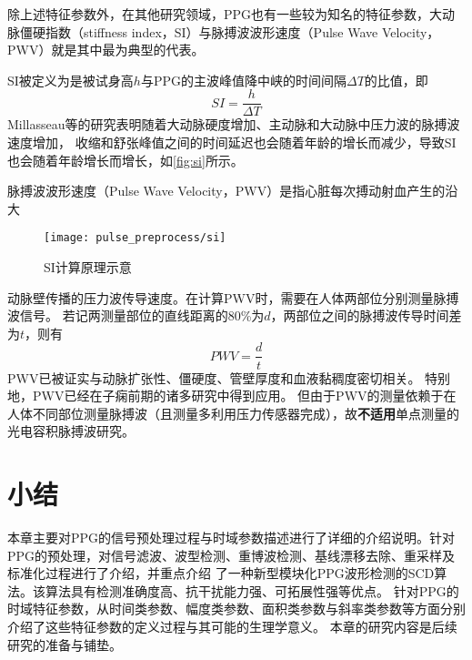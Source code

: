 除上述特征参数外，在其他研究领域，PPG也有一些较为知名的特征参数，大动脉僵硬指数（stiffness index，SI）与脉搏波波形速度（Pulse Wave Velocity，PWV）就是其中最为典型的代表。

SI被定义为是被试身高$h$与PPG的主波峰值降中峡的时间间隔$\Delta T$的比值\cite{Elgendi2012,Millasseau2002,Brumfield2005}，即
\begin{equation}
    \label{equ:si}
    SI = \frac{h}{\Delta T}
\end{equation}
Millasseau等\cite{Elgendi2012,Millasseau2002,Brumfield2005}的研究表明随着大动脉硬度增加、主动脉和大动脉中压力波的脉搏波速度增加，
收缩和舒张峰值之间的时间延迟也会随着年龄的增长而减少，导致SI也会随着年龄增长而增长，如\autoref{fig:si}所示。

脉搏波波形速度（Pulse Wave Velocity，PWV）是指心脏每次搏动射血产生的沿大
\clearpage
\begin{figure}[htbp]
    \centering
    \texttt{[image: pulse\_preprocess/si]}
    \caption[SI计算原理示意]{\label{fig:si}SI计算原理示意\cite{Elgendi2012,Millasseau2002,Brumfield2005}}
\end{figure}
\noindent
动脉壁传播的压力波传导速度\cite{Van2012}。在计算PWV时，需要在人体两部位分别测量脉搏波信号。
若记两测量部位的直线距离的80\%为$d$，两部位之间的脉搏波传导时间差为$t$，则有
\begin{equation}
    \label{equ:pwv}
    PWV = \frac{d}{t}
\end{equation}
PWV已被证实与动脉扩张性、僵硬度、管壁厚度和血液黏稠度密切相关。
特别地，PWV已经在子痫前期的诸多研究中得到应用\cite{Tomsin2012,Katsipi2014,VivianaIvan2018,Ira2014}。
但由于PWV的测量依赖于在人体不同部位测量脉搏波（且测量多利用压力传感器完成），故\textbf{不适用}单点测量的光电容积脉搏波研究。

\section{小结}
本章主要对PPG的信号预处理过程与时域参数描述进行了详细的介绍说明。针对PPG的预处理，对信号滤波、波型检测、重博波检测、基线漂移去除、重采样及标准化过程进行了介绍，并重点介绍
了一种新型模块化PPG波形检测的SCD算法。该算法具有检测准确度高、抗干扰能力强、可拓展性强等优点。
针对PPG的时域特征参数，从时间类参数、幅度类参数、面积类参数与斜率类参数等方面分别介绍了这些特征参数的定义过程与其可能的生理学意义。
本章的研究内容是后续研究的准备与铺垫。